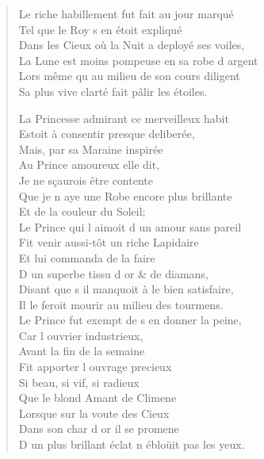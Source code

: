 \begin{verse}
Le riche habillement fut fait au jour marqué \\
\vin Tel que le Roy s\textquotesingle{} en étoit expliqué \\
Dans les Cieux où la Nuit a deployé ses voiles, \\
La Lune est moins pompeuse en sa robe d\textquotesingle{} argent \\
Lors même qu\textquotesingle{} au milieu de son cours diligent \\
Sa plus vive clarté fait pâlir les étoiles.

La Princesse admirant ce merveilleux habit \\
Estoit à consentir presque deliberée, \\
\vin Mais, par sa Maraine inspirée \\
\vin Au Prince amoureux elle dit, \\
\vin Je ne sçaurois être contente \\
Que je n\textquotesingle{} aye une Robe encore plus brillante \\
\vin Et de la couleur du Soleil; \\
Le Prince qui l\textquotesingle{} aimoit d\textquotesingle{} un amour sans pareil \\
Fit venir aussi-tôt un riche Lapidaire \\
\vin Et lui commanda de la faire \\
D\textquotesingle{} un superbe tissu d\textquotesingle{} or \& de diamans, \\
Disant que s\textquotesingle{} il manquoit à le bien satisfaire, \\
Il le feroit mourir au milieu des tourmens. \\
Le Prince fut exempt de s\textquotesingle{} en donner la peine, \\
\vin Car l\textquotesingle{} ouvrier industrieux, \\
\vin Avant la fin de la semaine \\
\vin Fit apporter l\textquotesingle{} ouvrage precieux \\
\vin Si beau, si vif, si radieux \\
\vin Que le blond Amant de Climene \\
\vin Lorsque sur la voute des Cieux \\
\vin Dans son char d\textquotesingle{} or il se promene \\
D\textquotesingle{} un plus brillant éclat n\textquotesingle{} ébloüit pas les yeux.


\end{verse}
